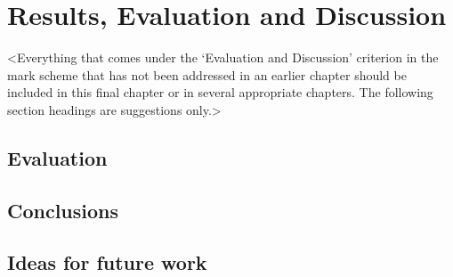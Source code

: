 \chapter{Results, Evaluation and Discussion}
\label{chapter4}

<Everything that comes under the `Evaluation and Discussion' criterion in the mark scheme that has not been addressed in an earlier chapter should be included in this final chapter or in several appropriate chapters. The following section headings are suggestions only.>

\section{Evaluation}
\lipsum[13]

\section{Conclusions}
\lipsum[13]

\section{Ideas for future work}
\lipsum[14]

